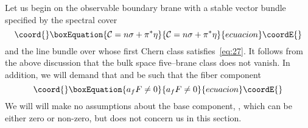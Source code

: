 \documentclass[a4paper,12pt]{article}
\numberwithin{equation}{section}
\def\cC{{\mathcal C}}
\def\cN{{\mathcal N}}
\theoremstyle{plain}
\begin{document}
Let us begin on the observable boundary brane 
with a stable \coordHE{} vector bundle \coordHE{} specified by the
spectral cover
\begin{equation}\coord{}\boxEquation{
\cC = n\sigma + \pi^{*}\eta
\label{eq:143}
}{
\cC = n\sigma + \pi^{*}\eta
}{ecuacion}\coordE{}\end{equation}
and the line bundle \myHighlight{$\cN$}\coordHE{} over \coordHE{} whose first Chern class
satisfies~\eqref{eq:27}. It follows from the above discussion that the bulk
space five--brane class \coordHE{} does not vanish. In addition,
we will demand that \coordHE{} and \coordHE{} be such that the fiber component
\begin{equation}\coord{}\boxEquation{
a_{f}F \neq 0
\label{eq:144}
}{
a_{f}F \neq 0
}{ecuacion}\coordE{}\end{equation}
We will will make no assumptions about the base component, \coordHE{},
which can be either zero or non-zero, but does not concern us in this section. 
\end{document}
